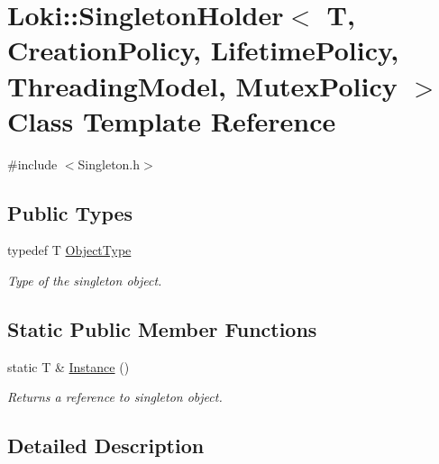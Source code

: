 \hypertarget{classLoki_1_1SingletonHolder}{}\section{Loki\+:\+:Singleton\+Holder$<$ T, Creation\+Policy, Lifetime\+Policy, Threading\+Model, Mutex\+Policy $>$ Class Template Reference}
\label{classLoki_1_1SingletonHolder}


{\ttfamily \#include $<$Singleton.\+h$>$}

\subsection*{Public Types}
\begin{DoxyCompactItemize}
\item 
\hypertarget{classLoki_1_1SingletonHolder_a90400cb32897f9942958bece12165136}{}typedef T \hyperlink{classLoki_1_1SingletonHolder_a90400cb32897f9942958bece12165136}{Object\+Type}\label{classLoki_1_1SingletonHolder_a90400cb32897f9942958bece12165136}

\begin{DoxyCompactList}\small\item\em Type of the singleton object. \end{DoxyCompactList}\end{DoxyCompactItemize}
\subsection*{Static Public Member Functions}
\begin{DoxyCompactItemize}
\item 
\hypertarget{classLoki_1_1SingletonHolder_a43e4ea5cb6291a8bb14eb7cdc2bcb7bf}{}static T \& \hyperlink{classLoki_1_1SingletonHolder_a43e4ea5cb6291a8bb14eb7cdc2bcb7bf}{Instance} ()\label{classLoki_1_1SingletonHolder_a43e4ea5cb6291a8bb14eb7cdc2bcb7bf}

\begin{DoxyCompactList}\small\item\em Returns a reference to singleton object. \end{DoxyCompactList}\end{DoxyCompactItemize}


\subsection{Detailed Description}
